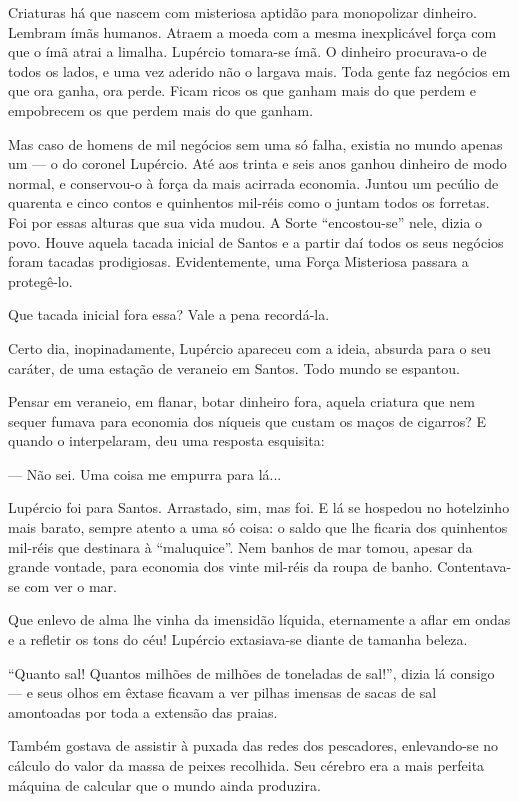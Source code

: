 Criaturas há que nascem com misteriosa aptidão para monopolizar
dinheiro. Lembram ímãs humanos. Atraem a moeda com a mesma inexplicável
força com que o ímã atrai a limalha. Lupércio tomara-se ímã. O dinheiro
procurava-o de todos os lados, e uma vez aderido não o largava mais.
Toda gente faz negócios em que ora ganha, ora perde. Ficam ricos os que
ganham mais do que perdem e empobrecem os que perdem mais do que ganham.

Mas caso de homens de mil negócios sem uma só falha, existia no mundo
apenas um --- o do coronel Lupércio. Até aos trinta e seis anos ganhou
dinheiro de modo normal, e conservou-o à força da mais acirrada
economia. Juntou um pecúlio de quarenta e cinco contos e quinhentos
mil-réis como o juntam todos os forretas. Foi por essas alturas que sua
vida mudou. A Sorte ``encostou-se'' nele, dizia o povo. Houve aquela
tacada inicial de Santos e a partir daí todos os seus negócios foram
tacadas prodigiosas. Evidentemente, uma Força Misteriosa passara a
protegê-lo.

Que tacada inicial fora essa? Vale a pena recordá-la.

Certo dia, inopinadamente, Lupércio apareceu com a ideia, absurda para o
seu caráter, de uma estação de veraneio em Santos. Todo mundo se
espantou.

Pensar em veraneio, em flanar, botar dinheiro fora, aquela criatura que
nem sequer fumava para economia dos níqueis que custam os maços de
cigarros? E quando o interpelaram, deu uma resposta esquisita:

--- Não sei. Uma coisa me empurra para lá...

Lupércio foi para Santos. Arrastado, sim, mas foi. E lá se hospedou no
hotelzinho mais barato, sempre atento a uma só coisa: o saldo que lhe
ficaria dos quinhentos mil-réis que destinara à ``maluquice''. Nem
banhos de mar tomou, apesar da grande vontade, para economia dos vinte
mil-réis da roupa de banho. Contentava-se com ver o mar.

Que enlevo de alma lhe vinha da imensidão líquida, eternamente a aflar
em ondas e a refletir os tons do céu! Lupércio extasiava-se diante de
tamanha beleza.

``Quanto sal! Quantos milhões de milhões de toneladas de sal!'', dizia
lá consigo --- e seus olhos em êxtase ficavam a ver pilhas imensas de
sacas de sal amontoadas por toda a extensão das praias.

Também gostava de assistir à puxada das redes dos pescadores,
enlevando-se no cálculo do valor da massa de peixes recolhida. Seu
cérebro era a mais perfeita máquina de calcular que o mundo ainda
produzira.

